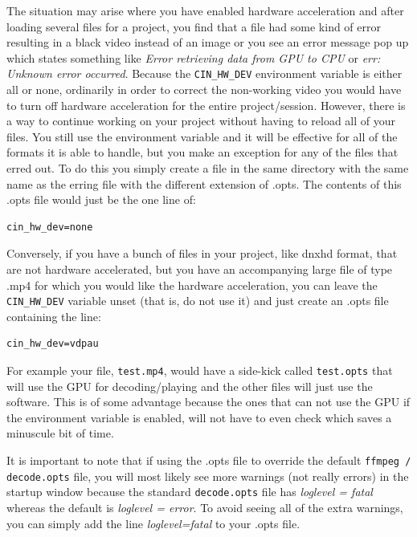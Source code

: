 The situation may arise where you have enabled hardware acceleration and after loading several files for a project, you find that a file had some kind of error resulting in a black video instead of an image or you see an error message pop up which states something like \textit{Error retrieving data from GPU to CPU} or \textit{err: Unknown error occurred}. Because the \texttt{CIN\_HW\_DEV} environment variable is either all or none, ordinarily in order to correct the non-working video you would have to turn off hardware acceleration for the entire project/session.  However, there is a way to continue working on your project without having to reload all of your files. You still use the environment variable and it will be effective for all of the formats it is able to handle, but you make an exception for any of the files that erred out. To do this you simply create a file in the same directory with the same name as the erring file with the different extension of .opts. The contents of this .opts file would just be the one line of:

\begin{lstlisting}[numbers=none]
cin_hw_dev=none
\end{lstlisting}
Conversely, if you have a bunch of files in your project, like dnxhd format, that are not hardware accelerated, but you have an accompanying large file of type .mp4 for which you would like the hardware acceleration, you can leave the \texttt{CIN\_HW\_DEV} variable unset (that is, do not use it) and just create an .opts file containing the line:


\begin{lstlisting}[numbers=none]
cin_hw_dev=vdpau
\end{lstlisting}

For example your file, \texttt{test.mp4}, would have a side-kick called \texttt{test.opts} that will use the GPU for decoding/playing and the other files will just use the software. This is of some advantage because the ones that can not use the GPU if the environment variable is enabled, will not have to even check which saves a minuscule bit of time.

It is important to note that if using the .opts file to override the default \texttt{ffmpeg / decode.opts} file, you will most likely see more warnings (not really errors) in the \CGG{} startup window because the standard \texttt{decode.opts} file has \textit{loglevel = fatal} whereas the default is \textit{loglevel = error}.  To avoid seeing all of the extra warnings, you can simply add the line   \textit{loglevel=fatal}   to your .opts file.

